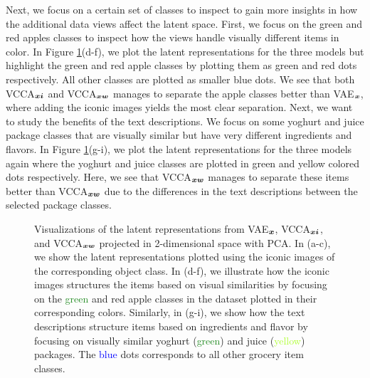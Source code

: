 Next, we focus on a certain set of classes to inspect to gain more insights in how the additional data views affect the latent space. First, we focus on the green and red apples classes to inspect how the views handle visually different items in color. In Figure \ref{fig:latent_space_visualizations}(d-f), we plot the latent representations for the three models but highlight the green and red apple classes by plotting them as green and red dots respectively. All other classes are plotted as smaller blue dots. We see that both VCCA$_{{\bm{x}} {\bm{i}}}$ and VCCA$_{{\bm{x}} {\bm{w}}}$ manages to separate the apple classes better than VAE$_{{\bm{x}}}$, where adding the iconic images yields the most clear separation. Next, we want to study the benefits of the text descriptions. We focus on some yoghurt and juice package classes that are visually similar but have very different ingredients and flavors. In Figure \ref{fig:latent_space_visualizations}(g-i), we plot the latent representations for the three models again where the yoghurt and juice classes are plotted in green and yellow colored dots respectively. Here, we see that VCCA$_{{\bm{x}} {\bm{w}}}$ manages to separate these items better than VCCA$_{{\bm{x}} {\bm{w}}}$ due to the differences in the text descriptions between the selected package classes. 

\begin{figure}[t]
	\centering
	
	\vspace{-2mm}
	\caption{ Visualizations of the latent representations from VAE$_{\bm{x}}$, VCCA$_{{\bm{x}}{\bm{i}}}$, and VCCA$_{{\bm{x}}{\bm{w}}}$ projected in 2-dimensional space with PCA. In (a-c), we show the latent representations plotted using the iconic images of the corresponding object class. In (d-f), we illustrate how the iconic images structures the items based on visual similarities by focusing on the \textcolor{ForestGreen}{green} and \textcolor{RedOrange}{red} apple classes in the dataset plotted in their corresponding colors. Similarly, in (g-i), we show how the text descriptions structure items based on ingredients and flavor by focusing on visually similar yoghurt (\textcolor{ForestGreen}{green}) and juice (\textcolor{GreenYellow}{yellow}) packages. The \textcolor{blue}{blue} dots corresponds to all other grocery item classes. } 
	\label{fig:latent_space_visualizations}
	\vspace{-3mm}
\end{figure}




